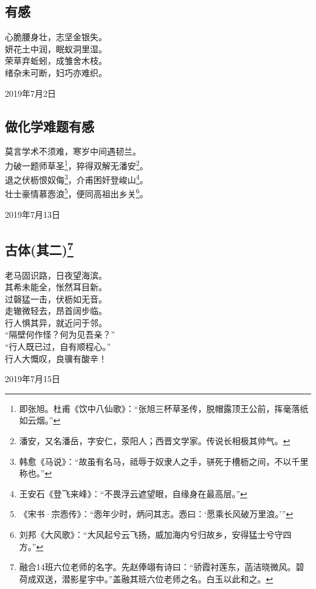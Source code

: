 \documentclass[a5paper]{ctexart}
\begin{document}
	\subsection{有感}
	\begin{center}
		心脆腰身壮，志坚金银失。\\
		妍花土中润，眠蚁洞里湿。\\
		荣草弃蚯蚓，成雏舍木枝。\\
		绪杂未可断，妇巧亦难织。
	\end{center}
	\begin{flushright}
			2019年7月2日
	\end{flushright}
	
	\subsection{做化学难题有感}
	\begin{center}
		莫言学术不须难，寒岁中间遇韧兰。\\
		力破一题师草圣\footnote{即张旭。杜甫《饮中八仙歌》：“张旭三杯草圣传，脱帽露顶王公前，挥毫落纸如云烟。”}，猝得双解无潘安\footnote{潘安，又名潘岳，字安仁，荥阳人；西晋文学家。传说长相极其帅气。}。\\
		退之伏枥恨奴侮\footnote{韩愈《马说》：“故虽有名马，祗辱于奴隶人之手，骈死于槽枥之间，不以千里称也。”}，介甫困奸登峻山\footnote{王安石《登飞来峰》：“不畏浮云遮望眼，自缘身在最高层。”}。\\
		壮士豪情慕悫浪\footnote{《宋书·宗悫传》：“悫年少时，炳问其志。悫曰：‘愿乘长风破万里浪。’”}，便同高祖出乡关\footnote{刘邦《大风歌》：“大风起兮云飞扬，威加海内兮归故乡，安得猛士兮守四方。”}。
		
	\end{center}
	\hfill 2019年7月13日
	
	\subsection[古体(其二)]{古体(其二)\footnote{融合14班六位老师的名字。先赵俸翊有诗曰：“骄霞衬莲东，菡洁晓微风。碧荷成双送，潜影星宇中。”盖融其班六位老师之名。白玉以此和之。
	}}
	\begin{center}
		老马固识路，日夜望海滨。\\
		其希未能全，怅然耳目新。\\
		过磬猛一击，伏枥如无音。\\
		走辙微轻去，昂首阔步临。\\
		行人惧其异，就近问于邻。\\
		“隔壁何作怪？何为见吾亲？”\\
		“行人既已过，自有顺程心。”\\
		行人大慨叹，良骥有酸辛！
	\end{center}
	\begin{flushright}
		2019年7月15日
	\end{flushright}
	
\end{document}
